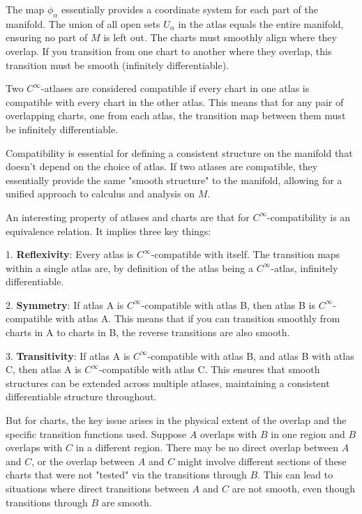 \documentclass{article}
\begin{document}
The map \(\phi_\alpha\) essentially provides a coordinate system for each part of the manifold. The union of all open sets \(U_\alpha\) in the atlas equals the entire manifold, ensuring no part of \(M\) is left out. The charts must smoothly align where they overlap. If you transition from one chart to another where they overlap, this transition must be smooth (infinitely differentiable).

Two \(C^\infty\)-atlases are considered compatible if every chart in one atlas is compatible with every chart in the other atlas. This means that for any pair of overlapping charts, one from each atlas, the transition map between them must be infinitely differentiable.

Compatibility is essential for defining a consistent structure on the manifold that doesn't depend on the choice of atlas. If two atlases are compatible, they essentially provide the same "smooth structure" to the manifold, allowing for a unified approach to calculus and analysis on \(M\).

An interesting property of atlases and charts are that for \(C^\infty\)-compatibility is an equivalence relation. It implies three key things:

1. \textbf{Reflexivity}: Every atlas is \(C^\infty\)-compatible with itself. The transition maps within a single atlas are, by definition of the atlas being a \(C^\infty\)-atlas, infinitely differentiable.

2. \textbf{Symmetry}: If atlas A is \(C^\infty\)-compatible with atlas B, then atlas B is \(C^\infty\)-compatible with atlas A. This means that if you can transition smoothly from charts in A to charts in B, the reverse transitions are also smooth.

3. \textbf{Transitivity}: If atlas A is \(C^\infty\)-compatible with atlas B, and atlas B with atlas C, then atlas A is \(C^\infty\)-compatible with atlas C. This ensures that smooth structures can be extended across multiple atlases, maintaining a consistent differentiable structure throughout.

But for charts, the key issue arises in the physical extent of the overlap and the specific transition functions used. Suppose \(A\) overlaps with \(B\) in one region and \(B\) overlaps with \(C\) in a different region. There may be no direct overlap between \(A\) and \(C\), or the overlap between \(A\) and \(C\) might involve different sections of these charts that were not "tested" via the transitions through \(B\). This can lead to situations where direct transitions between \(A\) and \(C\) are not smooth, even though transitions through \(B\) are smooth. 
\end{document}

